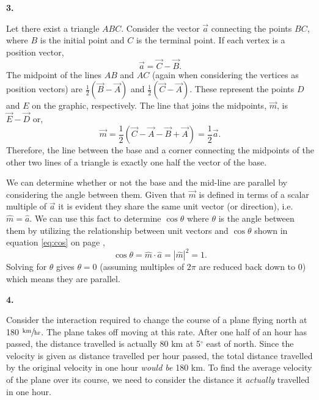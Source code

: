 \documentclass{article}
\newcommand{\qnumber}[1]{
\vspace{0.5cm}
\noindent
\textbf{#1.}
\vspace{4mm}
}
\begin{document}
\qnumber{3}

\begin{figure}[h]
    \centering


\end{figure}

\noindent
Let there exist a triangle $ABC$. Consider the vector $\vec{a}$ connecting the points $BC$, where $B$ is the initial point and $C$ is the terminal point. If each vertex is a position vector,
\[
    \vec{a}=\vec{C}-\vec{B}.  
\] 
The midpoint of the lines $AB$ and $AC$ (again when considering the vertices as position vectors) are $\frac{1}{2}(\vec{B}-\vec{A})$ and $\frac{1}{2}(\vec{C}-\vec{A})$. These represent the points $D$ and $E$ on the graphic, respectively. The line that joins the midpoints, $\vec{m}$, is $\vec{E} - \vec{D}$ or,
\[
    \vec{m}=\frac{1}{2}(\vec{C}-\vec{A} -\vec{B} + \vec{A} )=\frac{1}{2}\vec{a}.
\]
Therefore, the line between the base and a corner connecting the midpoints of the other two lines of a triangle is exactly one half the vector of the base.

We can determine whether or not the base and the mid-line are parallel by considering the angle between them. Given that $\vec{m}$ is defined in terms of a scalar multiple of $\vec{a}$ it is evident they share the same unit vector (or direction), i.e. $\hat{m}=\hat{a}$. We can use this fact to determine $\cos\theta$ where $\theta$ is the angle between them by utilizing the relationship between unit vectors and $\cos\theta$ shown in equation \ref{eq:cos} on page \pageref{eq:cos},
\[
    \cos\theta=\hat{m} \cdot \hat{a}=|\hat{m}|^2=1.
\]
Solving for $\theta$ gives $\theta=0$ (assuming multiples of $2\pi$ are reduced back down to 0) which means they are parallel.

\qnumber{4}

\noindent
Consider the interaction required to change the course of a plane flying north at 180 $\sfrac{\text{km}}{\text{hr}}$. The plane takes off moving at this rate. After one half of an hour has passed, the distance travelled is actually 80 km at 5$^\circ$ east of north. Since the velocity is given as distance travelled per hour passed, the total distance travelled by the original velocity in one hour \emph{would be} 180 km. To find the average velocity of the plane over its course, we need to consider the distance it \emph{actually} travelled in one hour. 
\end{document}
